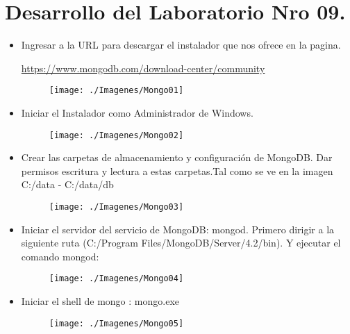 \section{Desarrollo del Laboratorio Nro 09.}

\begin{itemize}
	\subsection{Parte I: Instalación de MongoDB.}
		\item Ingresar a la URL para descargar el instalador que nos ofrece en la pagina.
			\begin{center}
					\url{https://www.mongodb.com/download-center/community}
				\end{center}
			\begin{figure}[htb]
				\begin{center}
					\texttt{[image: ./Imagenes/Mongo01]}
				\end{center}
			\end{figure}
		\item Iniciar el Instalador como Administrador de Windows.
			\begin{figure}[htb]
				\begin{center}
					\texttt{[image: ./Imagenes/Mongo02]}
				\end{center}
			\end{figure}
		\item Crear las carpetas de almacenamiento y configuración de MongoDB.
Dar permisos escritura y lectura a estas carpetas.Tal como se ve en la imagen
C:/data - C:/data/db
			\begin{figure}[htb]
				\begin{center}
					\texttt{[image: ./Imagenes/Mongo03]}
				\end{center}
			\end{figure}
		\item Iniciar el servidor del servicio de MongoDB: mongod. Primero dirigir a la siguiente ruta (C:/Program Files/MongoDB/Server/4.2/bin). Y ejecutar el comando mongod:
			\begin{figure}[htb]
				\begin{center}
					\texttt{[image: ./Imagenes/Mongo04]}
				\end{center}
			\end{figure}
			\vspace{3cm}
		\item Iniciar el shell de mongo : mongo.exe
			\begin{figure}[htb]
				\begin{center}
					\texttt{[image: ./Imagenes/Mongo05]}
				\end{center}
			\end{figure}

\end{itemize}
